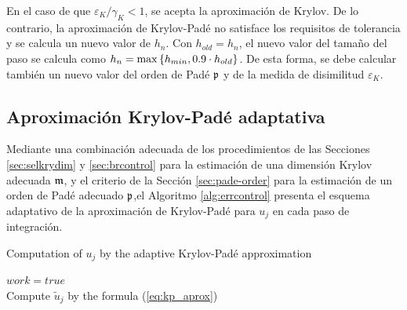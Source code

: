 En el caso de que $\varepsilon_{K}/\gamma_K< 1$, se acepta la aproximación de Krylov. De lo contrario, la aproximación de Krylov-Padé no satisface los requisitos de tolerancia y se calcula un nuevo valor de $h_n$. Con $h_{old}=h_n$, el nuevo valor del tamaño del paso se calcula como $h_n=\max\left\{ h_{min},0.9\cdot h_{old} \right\}$. De esta forma, se debe calcular también un nuevo valor del orden de Padé $\mathfrak{p}$ y de la medida de disimilitud $\varepsilon_{K}$.

\subsection{Aproximación Krylov-Padé adaptativa}\label{secc:krylov-Pade}
Mediante una combinación adecuada de los procedimientos de las Secciones \ref{sec:selkrydim} y \ref{sec:brcontrol} para la estimación de una dimensión Krylov adecuada $\mathfrak{m}$, y el criterio de la Sección \ref{sec:pade-order} para la estimación de un orden de Padé adecuado $\mathfrak{p}$,el Algoritmo \ref{alg:errcontrol} presenta el esquema adaptativo de la aproximación de Krylov-Padé para $u_j$ en cada paso de integración.

{\SetAlgoNoLine
\begin{algorithm}[h!]
	\caption{Computation of $u_j$ by the adaptive Krylov-Padé approximation}
	\label{alg:errcontrol}
	$work=true$\\
	Compute $\widetilde{u}_j$ by the formula (\ref{eq:kp_aprox})\\
\end{algorithm}}

